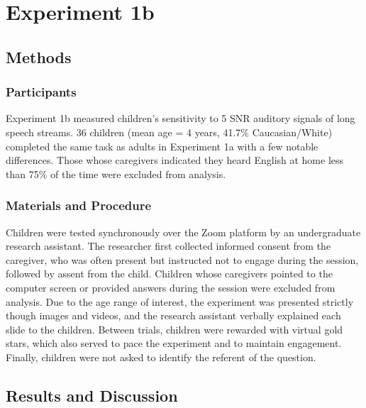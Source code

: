 \documentclass[10pt, letterpaper]{article}
\begin{document}
\hypertarget{experiment-1b}{%
\section{Experiment 1b}\label{experiment-1b}}

\hypertarget{methods-1}{%
\subsection{Methods}\label{methods-1}}

\hypertarget{participants-1}{%
\subsubsection{Participants}\label{participants-1}}

Experiment 1b measured children's sensitivity to 5 SNR auditory signals
of long speech streams. 36 children (mean age = 4 years, 41.7\%
Caucasian/White) completed the same task as adults in Experiment 1a with
a few notable differences. Those whose caregivers indicated they heard
English at home less than 75\% of the time were excluded from analysis.

\hypertarget{materials-and-procedure-1}{%
\subsubsection{Materials and
Procedure}\label{materials-and-procedure-1}}

Children were tested synchronously over the Zoom platform by an
undergraduate research assistant. The researcher first collected
informed consent from the caregiver, who was often present but
instructed not to engage during the session, followed by assent from the
child. Children whose caregivers pointed to the computer screen or
provided answers during the session were excluded from analysis. Due to
the age range of interest, the experiment was presented strictly though
images and videos, and the research assistant verbally explained each
slide to the children. Between trials, children were rewarded with
virtual gold stars, which also served to pace the experiment and to
maintain engagement. Finally, children were not asked to identify the
referent of the question.

\hypertarget{results-and-discussion-1}{%
\subsection{Results and Discussion}\label{results-and-discussion-1}}
\end{document}
